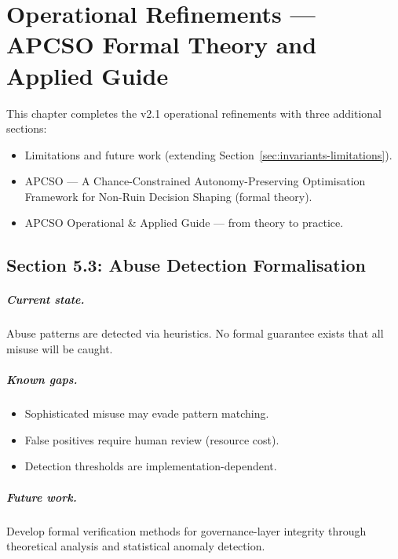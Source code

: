 
\chapter{Operational Refinements --- APCSO Formal Theory and
Applied Guide}
\label{ch:operational-refinements}

This chapter completes the v2.1 operational refinements with three
additional sections:

\begin{itemize}
\item Limitations and future work (extending
Section~\ref{sec:invariants-limitations}).
\item APCSO --- A Chance-Constrained Autonomy-Preserving
Optimisation Framework for Non-Ruin Decision Shaping (formal
theory).
\item APCSO Operational \& Applied Guide --- from theory to
practice.
\end{itemize}

\section{Section 5.3: Abuse Detection Formalisation}
\label{sec:abuse-detection-formalisation}

\paragraph{Current state.}
Abuse patterns are detected via heuristics. No formal guarantee
exists that all misuse will be caught.

\paragraph{Known gaps.}
\begin{itemize}
\item Sophisticated misuse may evade pattern matching.
\item False positives require human review (resource cost).
\item Detection thresholds are implementation-dependent.
\end{itemize}

\paragraph{Future work.}
Develop formal verification methods for governance-layer integrity
through theoretical analysis and statistical anomaly detection.


